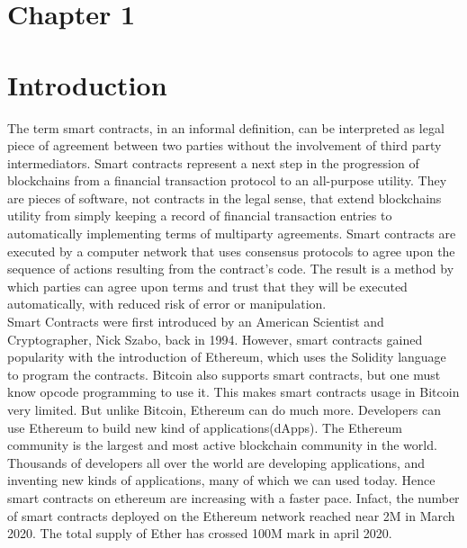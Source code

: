 \documentclass{article}
\begin{document}
\newpage

\section*{Chapter 1}
\section*{Introduction}


The term smart contracts, in an informal definition, can be interpreted as legal piece of agreement between two parties without the involvement of third party intermediators. Smart contracts represent a next step in the progression of blockchains from a financial transaction protocol to an all-purpose utility. They are pieces of software, not contracts in the legal sense, that extend blockchains utility from simply keeping a record of financial transaction entries to automatically implementing terms of multiparty agreements. Smart contracts are executed by a computer network that uses consensus protocols to agree upon the sequence of actions resulting from the contract’s code. The result is a method by which parties can agree upon terms and trust that they will be executed automatically, with reduced risk of error or manipulation. \\
Smart Contracts were first introduced by an American Scientist and Cryptographer, Nick Szabo, back in 1994. However, smart contracts gained popularity with the introduction of Ethereum, which uses the Solidity language to program the contracts. Bitcoin also supports smart contracts, but one must know opcode programming to use it. This makes smart contracts usage in Bitcoin very limited. But unlike Bitcoin, Ethereum can do much more. Developers can use Ethereum to build new kind of applications(dApps). The Ethereum community is the largest and most active blockchain community in the world. Thousands of developers all over the world are developing applications, and inventing new kinds of applications, many of which we can used today. Hence smart contracts on ethereum are increasing with a faster pace. Infact, the number of smart contracts deployed on the Ethereum network reached near 2M in March 2020. The total supply of Ether has crossed 100M mark in april 2020.\\
\end{document}

